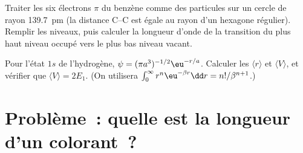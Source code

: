 \begin{exercise}[$\star\star\star$]\label{exo:b3:quantum-model-systems:11}
Traiter les six électrons $\pi$ du benzène comme des particules sur un
cercle de rayon \qty{139.7}{pm} (la distance C--C est égale au rayon d'un
hexagone régulier). Remplir les niveaux, puis calculer la longueur d'onde
de la transition du plus haut niveau occupé vers le plus bas niveau
vacant.
\end{exercise}

\begin{exercise}[$\star\star\star$]\label{exo:b3:quantum-model-systems:12}
Pour l'état $1s$ de l'hydrogène, $\psi = (\pi a^3)^{-1/2}\eu^{-r/a}$.
Calculer les  $\langle r\rangle$ et $\langle V\rangle$, et
vérifier que
$\langle V\rangle = 2E_1$. (On utilisera $\int_0^\infty r^n\eu^{-\beta r}\dd r =
n!/\beta^{n+1}$.)
\end{exercise}

\section{Problème~: quelle est la longueur d'un colorant~?}

